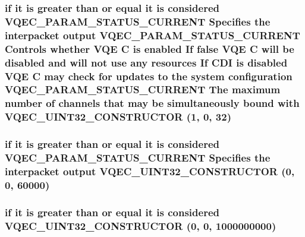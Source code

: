 \subsubsection{\setlength{\rightskip}{0pt plus 5cm}if it is greater than or equal it is considered VQEC\_\-PARAM\_\-STATUS\_\-CURRENT Specifies the interpacket output VQEC\_\-PARAM\_\-STATUS\_\-CURRENT Controls whether VQE \bf{C} is enabled If false VQE \bf{C} will be disabled and will not use any resources If CDI is disabled VQE \bf{C} may check for updates \bf{to} the system configuration VQEC\_\-PARAM\_\-STATUS\_\-CURRENT The maximum number of \bf{channels} that may be simultaneously bound with VQEC\_\-UINT32\_\-CONSTRUCTOR (1, 0, 32)}\label{vqec__cfg__settings_8h_cbeccdc98eb46649f3067822697e452e}


\subsubsection{\setlength{\rightskip}{0pt plus 5cm}if it is greater than or equal it is considered VQEC\_\-PARAM\_\-STATUS\_\-CURRENT Specifies the interpacket output VQEC\_\-UINT32\_\-CONSTRUCTOR (0, 0, 60000)}\label{vqec__cfg__settings_8h_9e5b74cac36591cf031ec0562e3910d2}


\subsubsection{\setlength{\rightskip}{0pt plus 5cm}if it is greater than or equal it is considered VQEC\_\-UINT32\_\-CONSTRUCTOR (0, 0, 1000000000)}\label{vqec__cfg__settings_8h_172b66370acaaceb69c4ac1bb3d992db}


